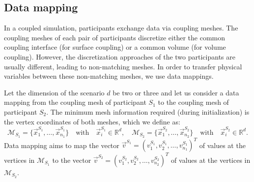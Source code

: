 \subsection{Data mapping} 
\label{ssec:mapping}

In a coupled simulation, participants exchange data via coupling meshes. 
The coupling meshes of each pair of participants discretize either the common coupling interface (for surface coupling) or a common volume (for volume coupling).
However, the discretization approaches of the two participants are usually different, leading to non-matching meshes.
In order to transfer physical variables between these non-matching meshes, we use data mappings.

Let the dimension of the scenario $d$ be two or three and let us consider a data mapping from the coupling mesh of participant $S_1$ to the coupling mesh of participant $S_2$. 
The minimum mesh information required (during initialization) is the vertex coordinates of both meshes, which we define as:
%
\[
\mathcal{M}_{S_1} = \lbrace \vec{x}_{1}^{S_1}, \ldots, \vec{x}_{n_{1}}^{S_1} \rbrace \quad \mbox{with} \quad \vec{x}_{i}^{S_1} \in \mathbb{R}^{d}, \quad 
\mathcal{M}_{S_2} = \lbrace \vec{x}_{1}^{S_2}, \ldots, \vec{x}_{n_2}^{S_2} \rbrace \quad \mbox{with} \quad \vec{x}_{i}^{S_2} \in \mathbb{R}^{d}.
\]
%
Data mapping aims to map the vector $\vec{v}^{S_1} = (v_1^{S_1}, v_2^{S_1}, \ldots, v_{n_1}^{S_1})^T$ of values at the vertices in $\mathcal{M}_{S_1}$ to the vector $\vec{v}^{S_2} = ( v_1^{S_2}, v_2^{S_2}, \ldots, v_{n_2}^{S_2})^T$ of values at the vertices in $\mathcal{M}_{S_2}$. 

